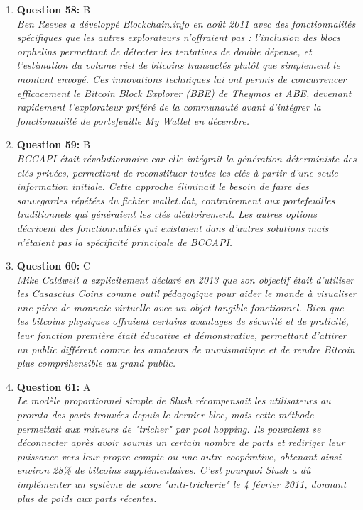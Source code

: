 \documentclass[12pt,a4paper]{article}
\begin{document}
\begin{enumerate}
\item \textbf{Question 58:} B
\\ \textit{Ben Reeves a développé Blockchain.info en août 2011 avec des fonctionnalités spécifiques que les autres explorateurs n'offraient pas : l'inclusion des blocs orphelins permettant de détecter les tentatives de double dépense, et l'estimation du volume réel de bitcoins transactés plutôt que simplement le montant envoyé. Ces innovations techniques lui ont permis de concurrencer efficacement le Bitcoin Block Explorer (BBE) de Theymos et ABE, devenant rapidement l'explorateur préféré de la communauté avant d'intégrer la fonctionnalité de portefeuille My Wallet en décembre.}

\item \textbf{Question 59:} B
\\ \textit{BCCAPI était révolutionnaire car elle intégrait la génération déterministe des clés privées, permettant de reconstituer toutes les clés à partir d'une seule information initiale. Cette approche éliminait le besoin de faire des sauvegardes répétées du fichier wallet.dat, contrairement aux portefeuilles traditionnels qui généraient les clés aléatoirement. Les autres options décrivent des fonctionnalités qui existaient dans d'autres solutions mais n'étaient pas la spécificité principale de BCCAPI.}

\item \textbf{Question 60:} C
\\ \textit{Mike Caldwell a explicitement déclaré en 2013 que son objectif était d'utiliser les Casascius Coins comme outil pédagogique pour aider le monde à visualiser une pièce de monnaie virtuelle avec un objet tangible fonctionnel. Bien que les bitcoins physiques offraient certains avantages de sécurité et de praticité, leur fonction première était éducative et démonstrative, permettant d'attirer un public différent comme les amateurs de numismatique et de rendre Bitcoin plus compréhensible au grand public.}

\item \textbf{Question 61:} A
\\ \textit{Le modèle proportionnel simple de Slush récompensait les utilisateurs au prorata des parts trouvées depuis le dernier bloc, mais cette méthode permettait aux mineurs de "tricher" par pool hopping. Ils pouvaient se déconnecter après avoir soumis un certain nombre de parts et rediriger leur puissance vers leur propre compte ou une autre coopérative, obtenant ainsi environ 28\% de bitcoins supplémentaires. C'est pourquoi Slush a dû implémenter un système de score "anti-tricherie" le 4 février 2011, donnant plus de poids aux parts récentes.}


\end{enumerate}
\end{document}
